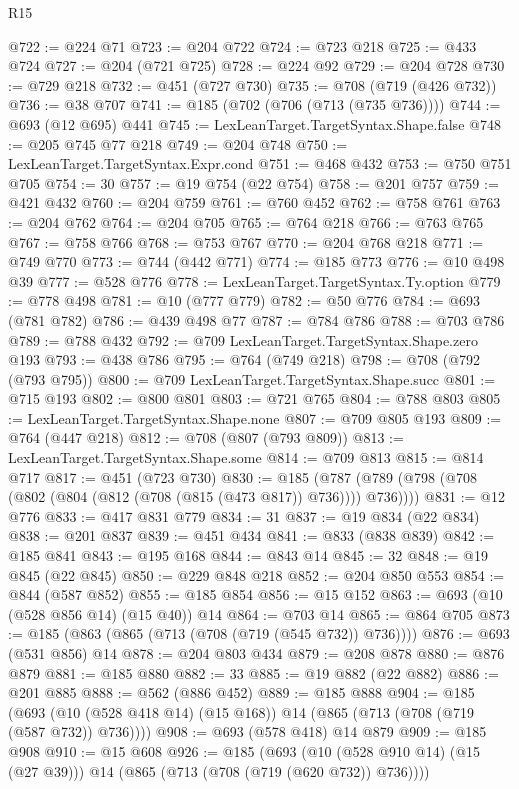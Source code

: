 \begin{lexlean}{R15}
\begin{coremodule}
@722 := @224 @71
@723 := @204 @722
@724 := @723 @218
@725 := @433 @724
@727 := @204 (@721 @725)
@728 := @224 @92
@729 := @204 @728
@730 := @729 @218
@732 := @451 (@727 @730)
@735 := @708 (@719 (@426 @732))
@736 := @38 @707
@741 := @185 (@702 (@706 (@713 (@735 @736))))
@744 := @693 (@12 @695) @441
@745 := LexLeanTarget.TargetSyntax.Shape.false
@748 := @205 @745 @77 @218
@749 := @204 @748
@750 := LexLeanTarget.TargetSyntax.Expr.cond
@751 := @468 @432
@753 := @750 @751 @705
@754 := 30
@757 := @19 @754 (@22 @754)
@758 := @201 @757
@759 := @421 @432
@760 := @204 @759
@761 := @760 @452
@762 := @758 @761
@763 := @204 @762
@764 := @204 @705
@765 := @764 @218
@766 := @763 @765
@767 := @758 @766
@768 := @753 @767
@770 := @204 @768 @218
@771 := @749 @770
@773 := @744 (@442 @771)
@774 := @185 @773
@776 := @10 @498 @39
@777 := @528 @776
@778 := LexLeanTarget.TargetSyntax.Ty.option
@779 := @778 @498
@781 := @10 (@777 @779)
@782 := @50 @776
@784 := @693 (@781 @782)
@786 := @439 @498 @77
@787 := @784 @786
@788 := @703 @786
@789 := @788 @432
@792 := @709 LexLeanTarget.TargetSyntax.Shape.zero @193
@793 := @438 @786
@795 := @764 (@749 @218)
@798 := @708 (@792 (@793 @795))
@800 := @709 LexLeanTarget.TargetSyntax.Shape.succ
@801 := @715 @193
@802 := @800 @801
@803 := @721 @765
@804 := @788 @803
@805 := LexLeanTarget.TargetSyntax.Shape.none
@807 := @709 @805 @193
@809 := @764 (@447 @218)
@812 := @708 (@807 (@793 @809))
@813 := LexLeanTarget.TargetSyntax.Shape.some
@814 := @709 @813
@815 := @814 @717
@817 := @451 (@723 @730)
@830 := @185 (@787 (@789 (@798 (@708 (@802 (@804 (@812 (@708 (@815 (@473 @817)) @736)))) @736))))
@831 := @12 @776
@833 := @417 @831 @779
@834 := 31
@837 := @19 @834 (@22 @834)
@838 := @201 @837
@839 := @451 @434
@841 := @833 (@838 @839)
@842 := @185 @841
@843 := @195 @168
@844 := @843 @14
@845 := 32
@848 := @19 @845 (@22 @845)
@850 := @229 @848 @218
@852 := @204 @850 @553
@854 := @844 (@587 @852)
@855 := @185 @854
@856 := @15 @152
@863 := @693 (@10 (@528 @856 @14) (@15 @40)) @14
@864 := @703 @14
@865 := @864 @705
@873 := @185 (@863 (@865 (@713 (@708 (@719 (@545 @732)) @736))))
@876 := @693 (@531 @856) @14
@878 := @204 @803 @434
@879 := @208 @878
@880 := @876 @879
@881 := @185 @880
@882 := 33
@885 := @19 @882 (@22 @882)
@886 := @201 @885
@888 := @562 (@886 @452)
@889 := @185 @888
@904 := @185
    (@693 (@10 (@528 @418 @14) (@15 @168)) @14 (@865 (@713 (@708 (@719 (@587 @732)) @736))))
@908 := @693 (@578 @418) @14 @879
@909 := @185 @908
@910 := @15 @608
@926 := @185
    (@693 (@10 (@528 @910 @14) (@15 (@27 @39))) @14 (@865 (@713 (@708 (@719 (@620 @732)) @736))))

\end{coremodule}
\end{lexlean}

